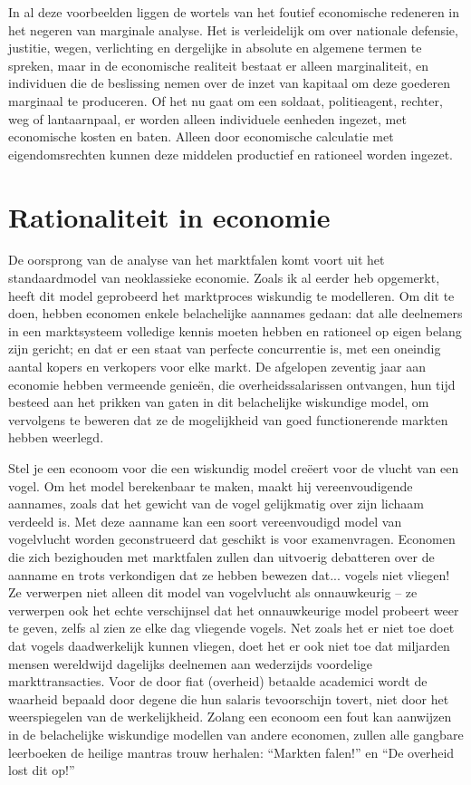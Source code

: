 In al deze voorbeelden liggen de wortels van het foutief economische redeneren in het negeren van marginale analyse. Het is verleidelijk om over nationale defensie, justitie, wegen, verlichting en dergelijke in absolute en algemene termen te spreken, maar in de economische realiteit bestaat er alleen marginaliteit, en individuen die de beslissing nemen over de inzet van kapitaal om deze goederen marginaal te produceren. Of het nu gaat om een soldaat, politieagent, rechter, weg of lantaarnpaal, er worden alleen individuele eenheden ingezet, met economische kosten en baten. Alleen door economische calculatie met eigendomsrechten kunnen deze middelen productief en rationeel worden ingezet.

\hypertarget{rationaliteit-in-economie}{%
\section{Rationaliteit in economie}\label{rationaliteit-in-economie}}

De oorsprong van de analyse van het marktfalen komt voort uit het standaardmodel van neoklassieke economie. Zoals ik al eerder heb opgemerkt, heeft dit model geprobeerd het marktproces wiskundig te modelleren. Om dit te doen, hebben economen enkele belachelijke aannames gedaan: dat alle deelnemers in een marktsysteem volledige kennis moeten hebben en rationeel op eigen belang zijn gericht; en dat er een staat van perfecte concurrentie is, met een oneindig aantal kopers en verkopers voor elke markt. De afgelopen zeventig jaar aan economie hebben vermeende genieën, die overheidssalarissen ontvangen, hun tijd besteed aan het prikken van gaten in dit belachelijke wiskundige model, om vervolgens te beweren dat ze de mogelijkheid van goed functionerende markten hebben weerlegd.

Stel je een econoom voor die een wiskundig model creëert voor de vlucht van een vogel. Om het model berekenbaar te maken, maakt hij vereenvoudigende aannames, zoals dat het gewicht van de vogel gelijkmatig over zijn lichaam verdeeld is. Met deze aanname kan een soort vereenvoudigd model van vogelvlucht worden geconstrueerd dat geschikt is voor examenvragen. Economen die zich bezighouden met marktfalen zullen dan uitvoerig debatteren over de aanname en trots verkondigen dat ze hebben bewezen dat... vogels niet vliegen! Ze verwerpen niet alleen dit model van vogelvlucht als onnauwkeurig -- ze verwerpen ook het echte verschijnsel dat het onnauwkeurige model probeert weer te geven, zelfs al zien ze elke dag vliegende vogels. Net zoals het er niet toe doet dat vogels daadwerkelijk kunnen vliegen, doet het er ook niet toe dat miljarden mensen wereldwijd dagelijks deelnemen aan wederzijds voordelige markttransacties. Voor de door fiat (overheid) betaalde academici wordt de waarheid bepaald door degene die hun salaris tevoorschijn tovert, niet door het weerspiegelen van de werkelijkheid. Zolang een econoom een fout kan aanwijzen in de belachelijke wiskundige modellen van andere economen, zullen alle gangbare leerboeken de heilige mantra\textquotesingle s trouw herhalen: ``Markten falen!'' en ``De overheid lost dit op!''

